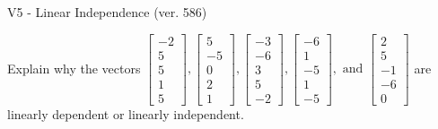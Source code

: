 \begin{exercise}
  \begin{exerciseTitle}V5 - Linear Independence (ver. 586)\end{exerciseTitle}
  \begin{exerciseStatement}
    Explain why the vectors \(\left[\begin{array}{r}
-2 \\
5 \\
5 \\
1 \\
5
\end{array}\right] , \left[\begin{array}{r}
5 \\
-5 \\
0 \\
2 \\
1
\end{array}\right] , \left[\begin{array}{r}
-3 \\
-6 \\
3 \\
5 \\
-2
\end{array}\right] , \left[\begin{array}{r}
-6 \\
1 \\
-5 \\
1 \\
-5
\end{array}\right] , \text{ and } \left[\begin{array}{r}
2 \\
5 \\
-1 \\
-6 \\
0
\end{array}\right]\) are linearly dependent or linearly independent.	



\end{exerciseStatement}
\end{exercise}
